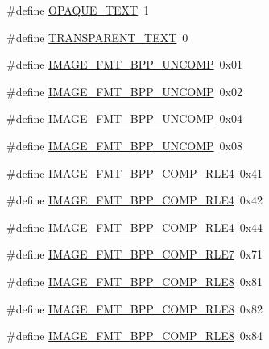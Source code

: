 \begin{DoxyCompactItemize}
\#define \hyperlink{group__primitives__api_gafe835b969123997a980c6a8cf5e894ad}{O\+P\+A\+Q\+U\+E\+\_\+\+T\+E\+X\+T}~1
\item 
\#define \hyperlink{group__primitives__api_gad695acdc62140c7331ceca34a5b7ee3a}{T\+R\+A\+N\+S\+P\+A\+R\+E\+N\+T\+\_\+\+T\+E\+X\+T}~0
\item 
\#define \hyperlink{group__primitives__api_gaf52f1ace0da5f096d0523287d82bb2f0}{I\+M\+A\+G\+E\+\_\+\+F\+M\+T\+\_\+B\+P\+P\+\_\+\+U\+N\+C\+O\+M\+P}~0x01
\item 
\#define \hyperlink{group__primitives__api_gae21c6254656f549acab02d0015f02062}{I\+M\+A\+G\+E\+\_\+\+F\+M\+T\+\_\+B\+P\+P\+\_\+\+U\+N\+C\+O\+M\+P}~0x02
\item 
\#define \hyperlink{group__primitives__api_ga68d128062b1b4fb7efcc48d13efc74ce}{I\+M\+A\+G\+E\+\_\+\+F\+M\+T\+\_\+B\+P\+P\+\_\+\+U\+N\+C\+O\+M\+P}~0x04
\item 
\#define \hyperlink{group__primitives__api_gac27c5571d2b7ea9f81c70defb0d8ec97}{I\+M\+A\+G\+E\+\_\+\+F\+M\+T\+\_\+B\+P\+P\+\_\+\+U\+N\+C\+O\+M\+P}~0x08
\item 
\#define \hyperlink{group__primitives__api_ga379188b1df5d4ee2cf83eec447362cc5}{I\+M\+A\+G\+E\+\_\+\+F\+M\+T\+\_\+B\+P\+P\+\_\+\+C\+O\+M\+P\+\_\+\+R\+L\+E4}~0x41
\item 
\#define \hyperlink{group__primitives__api_ga292f87814ebe2868d1e6f3f3c5c3c0a7}{I\+M\+A\+G\+E\+\_\+\+F\+M\+T\+\_\+B\+P\+P\+\_\+\+C\+O\+M\+P\+\_\+\+R\+L\+E4}~0x42
\item 
\#define \hyperlink{group__primitives__api_ga8a9dc5858e40e6b42942e8f379fef92c}{I\+M\+A\+G\+E\+\_\+\+F\+M\+T\+\_\+B\+P\+P\+\_\+\+C\+O\+M\+P\+\_\+\+R\+L\+E4}~0x44
\item 
\#define \hyperlink{group__primitives__api_ga2f4116b74a4471c248927d2b7065c5cc}{I\+M\+A\+G\+E\+\_\+\+F\+M\+T\+\_\+B\+P\+P\+\_\+\+C\+O\+M\+P\+\_\+\+R\+L\+E7}~0x71
\item 
\#define \hyperlink{group__primitives__api_ga69328ee0c502505ea2c8a583551e92c2}{I\+M\+A\+G\+E\+\_\+\+F\+M\+T\+\_\+B\+P\+P\+\_\+\+C\+O\+M\+P\+\_\+\+R\+L\+E8}~0x81
\item 
\#define \hyperlink{group__primitives__api_ga8ba6d2c7a4793132f76b305ffbd4e35b}{I\+M\+A\+G\+E\+\_\+\+F\+M\+T\+\_\+B\+P\+P\+\_\+\+C\+O\+M\+P\+\_\+\+R\+L\+E8}~0x82
\item 
\#define \hyperlink{group__primitives__api_gabb7ca1f563cf8d168daea6f068df6433}{I\+M\+A\+G\+E\+\_\+\+F\+M\+T\+\_\+B\+P\+P\+\_\+\+C\+O\+M\+P\+\_\+\+R\+L\+E8}~0x84
\item 

\end{DoxyCompactItemize}
